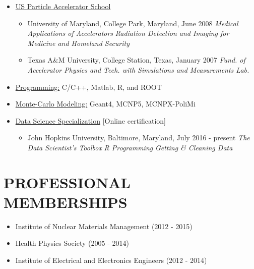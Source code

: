 \documentclass[paper=letter,fontsize=11pt]{scrartcl} %
\newcommand{\NewPart}[2]{\section*{\uppercase{#1} #2}}
\begin{document}
\begin{itemize}
\item {\underline{US Particle Accelerator School}}
\begin{itemize}
\item {University of Maryland, College Park, Maryland}{, June 2008}
\subitem \textit{Medical Applications of Accelerators}
\subitem \textit{Radiation Detection and Imaging for Medicine and Homeland Security}

\item Texas A\&M University, College Station, Texas, January 2007
\subitem \textit{Fund. of Accelerator Physics and Tech. with Simulations and Measurements Lab.}
\end{itemize}

\item \underline{Programming:} C/C++, Matlab, R, and ROOT
\item \underline{Monte-Carlo Modeling:} Geant4, MCNP5, MCNPX-PoliMi

\item {\underline{Data Science Specialization}{{ [Online certification]}}}
\begin{itemize}
\item John Hopkins  University, Baltimore, Maryland, July 2016 - present
\subitem \textit{The Data Scientist's Toolbox}
\subitem \textit{R Programming}
\subitem \textit{Getting \& Cleaning Data}
\end{itemize}

\end{itemize}

\NewPart{PROFESSIONAL MEMBERSHIPS}{}
\begin{itemize}
\item Institute of Nuclear Materials Management (2012 - 2015)
\item Health Physics Society (2005 - 2014)
\item Institute of Electrical and Electronics Engineers (2012 - 2014)
\end{itemize}
\end{document}

